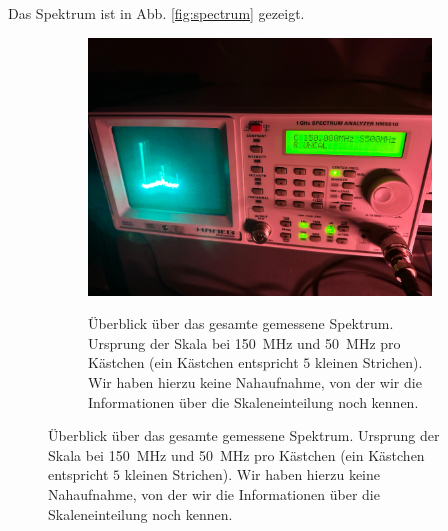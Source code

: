 \documentclass{article}
\begin{document}
Das Spektrum ist in Abb. \ref{fig:spectrum} gezeigt.
\begin{figure}[h]
  \centering
  \begin{subfigure}{0.49\textwidth}
    \centering
    \includegraphics[width=\textwidth,trim={0 15cm 0 21cm},clip=true]{spectrum0}
    \label{fig:spectrum0}
    \caption{Überblick über das gesamte gemessene Spektrum. Ursprung der Skala bei \SI{150}{\MHz} und \SI{50}{\MHz}
      pro Kästchen (ein Kästchen entspricht $5$ kleinen Strichen).
      Wir haben hierzu keine Nahaufnahme, von der wir die Informationen über die Skaleneinteilung noch kennen.}
  \end{subfigure}
  


\end{figure}
\end{document}
